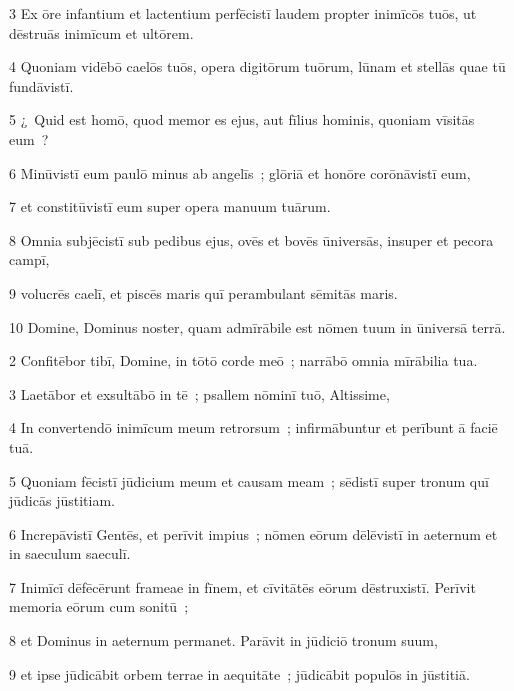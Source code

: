 \psalmVerse
  {\phantom{00}3}
  {Ex ōre infantium et lactentium perfēcistī laudem propter inimīcōs tuōs, ut dēstruās inimīcum et ultōrem.}


\psalmVerse
  {\phantom{00}4}
  {Quoniam vidēbō caelōs tuōs, opera digitōrum tuōrum, lūnam et stellās quae tū fundāvistī.}


\psalmVerse
  {\phantom{00}5}
  {¿~Quid est homō, quod memor es ejus, aut fīlius hominis, quoniam vīsitās eum~?}


\psalmVerse
  {\phantom{00}6}
  {Minūvistī eum paulō minus ab angelīs~; glōriā et honōre corōnāvistī eum,}


\psalmVerse
  {\phantom{00}7}
  {et constitūvistī eum super opera manuum tuārum.}


\psalmVerse
  {\phantom{00}8}
  {Omnia subjēcistī sub pedibus ejus, ovēs et bovēs ūniversās, insuper et pecora campī,}


\psalmVerse
  {\phantom{00}9}
  {volucrēs caelī, et piscēs maris quī perambulant sēmitās maris.}


\psalmVerse
  {\phantom{0}10}
  {Domine, Dominus noster, quam admīrābile est nōmen tuum in ūniversā terrā.}




\psalmVerse
  {\phantom{00}2}
  {Confitēbor tibī, Domine, in tōtō corde meō~; narrābō omnia mīrābilia tua.}


\psalmVerse
  {\phantom{00}3}
  {Laetābor et exsultābō in tē~; psallem nōminī tuō, Altissime,}


\psalmVerse
  {\phantom{00}4}
  {In convertendō inimīcum meum retrorsum~; infirmābuntur et perībunt ā faciē tuā.}


\psalmVerse
  {\phantom{00}5}
  {Quoniam fēcistī jūdicium meum et causam meam~; sēdistī super tronum quī jūdicās jūstitiam.}


\psalmVerse
  {\phantom{00}6}
  {Increpāvistī Gentēs, et perīvit impius~; nōmen eōrum dēlēvistī in aeternum et in saeculum saeculī.}


\psalmVerse
  {\phantom{00}7}
  {Inimīcī dēfēcērunt frameae in fīnem, et cīvitātēs eōrum dēstruxistī. Perīvit memoria eōrum cum sonitū~;}


\psalmVerse
  {\phantom{00}8}
  {et Dominus in aeternum permanet. Parāvit in jūdiciō tronum suum,}


\psalmVerse
  {\phantom{00}9}
  {et ipse jūdicābit orbem terrae in aequitāte~; jūdicābit populōs in jūstitiā.}


